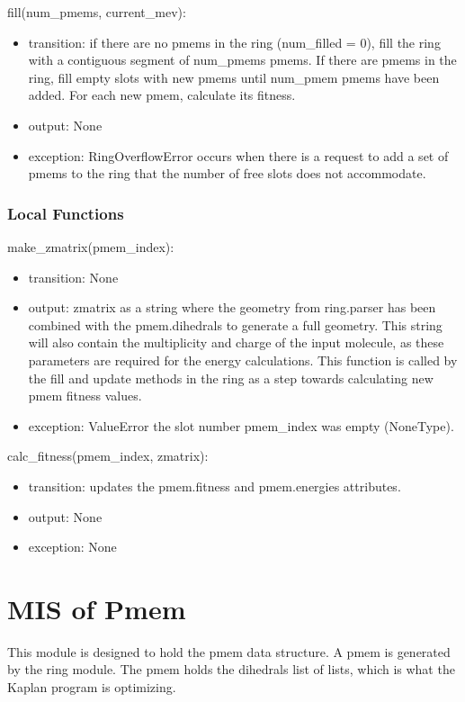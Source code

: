 \documentclass[12pt, titlepage]{article}
\newcommand{\progname}{Kaplan}
\begin{document}
\noindent fill(num\_pmems, current\_mev):
\begin{itemize}
	\item transition: if there are no pmems in the ring (num\_filled = 0), fill 
	the ring with a contiguous segment of num\_pmems pmems. If there are pmems 
	in the ring, fill empty slots with new pmems until num\_pmem pmems have 
	been added. For each new pmem, calculate its fitness.
	\item output: None
	\item exception: RingOverflowError occurs when there is a request to add a 
	set of pmems to the ring that the number of free slots does not accommodate.
\end{itemize}

\subsubsection{Local Functions}

\noindent make\_zmatrix(pmem\_index):
\begin{itemize}
	\item transition: None
	\item output: zmatrix as a string where the geometry from ring.parser has 
	been combined with the pmem.dihedrals to generate a full geometry. This 
	string will also contain the multiplicity and charge of the input molecule, 
	as these parameters are required for the energy calculations. This function 
	is called by the fill and update methods in the ring as a step towards 
	calculating new pmem fitness values.
	\item exception: ValueError the slot number pmem\_index was empty 
	(NoneType).
\end{itemize}

\noindent calc\_fitness(pmem\_index, zmatrix):
\begin{itemize}
	\item transition: updates the pmem.fitness and pmem.energies attributes.
	\item output: None
	\item exception: None
\end{itemize}

\newpage

\section{MIS of Pmem} \label{section-pmem} %

This module is designed to hold the pmem data structure. A pmem is generated by 
the ring module. The pmem holds the dihedrals list of lists, which is what the 
\progname{} program is optimizing.
\end{document}
